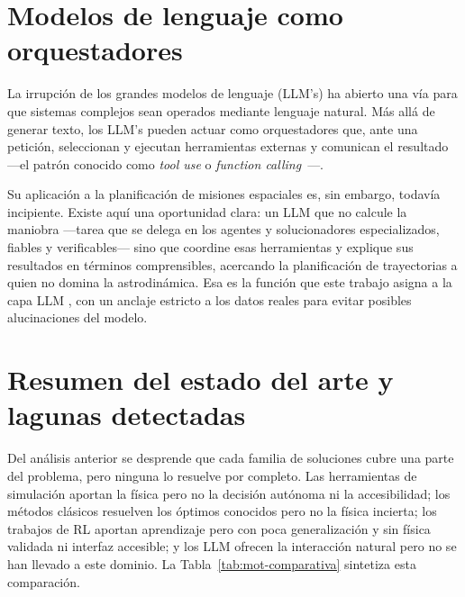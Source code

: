 {\section{Modelos de lenguaje como orquestadores}
\label{sec:mot-llm}

La irrupción de los grandes modelos de lenguaje (\gls{LLM}'s) ha abierto una vía para que sistemas complejos sean operados mediante lenguaje natural. Más allá de generar texto, los \gls{LLM}'s pueden actuar como orquestadores que, ante una petición, seleccionan y ejecutan herramientas externas y comunican el resultado ---el patrón conocido como \textit{tool use} o \textit{function calling}~\cite{yao2022react,schick2023toolformer}---.

Su aplicación a la planificación de misiones espaciales es, sin embargo, todavía incipiente. Existe aquí una oportunidad clara: un \gls{LLM}  que no calcule la maniobra ---tarea que se delega en los agentes y solucionadores especializados, fiables y verificables--- sino que coordine esas herramientas y explique sus resultados en términos comprensibles, acercando la planificación de trayectorias a quien no domina la astrodinámica. Esa es la función que este trabajo asigna a la capa \gls{LLM} , con un anclaje estricto a los datos reales para evitar posibles alucinaciones del modelo.

\section{Resumen del estado del arte y lagunas detectadas}
\label{sec:mot-resumen}

Del análisis anterior se desprende que cada familia de soluciones cubre una parte del problema, pero ninguna lo resuelve por completo. Las herramientas de simulación aportan la física pero no la decisión autónoma ni la accesibilidad; los métodos clásicos resuelven los óptimos conocidos pero no la física incierta; los trabajos de \gls{RL} aportan aprendizaje pero con poca generalización y sin física validada ni interfaz accesible; y los \gls{LLM} ofrecen la interacción natural pero no se han llevado a este dominio. La Tabla~\ref{tab:mot-comparativa} sintetiza esta comparación.

}
